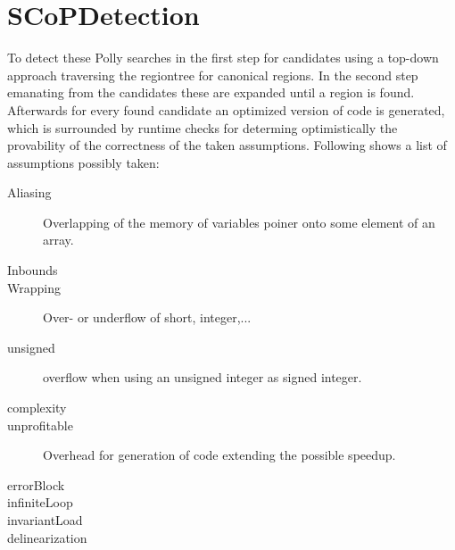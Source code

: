 \section{SCoPDetection}
To detect these \scops Polly searches in the first step for candidates using a top-down approach traversing the regiontree for canonical regions.
In the second step emanating from the candidates these are expanded until a  region is found.
Afterwards  for every found candidate an optimized version of code is generated, which is surrounded by runtime checks for determing optimistically the provability of the correctness of the taken assumptions.
Following shows a list of assumptions possibly taken:
\begin{description}
    \item[Aliasing] Overlapping of the memory of variables \eg poiner onto some element of an array.
    \item[Inbounds] 
    \item[Wrapping] Over- or underflow of short, integer,...
    \item[unsigned] \Eg overflow when using an unsigned integer as signed integer.
    \item[complexity] 
    \item[unprofitable] Overhead for generation of code extending the possible speedup.
    \item[errorBlock]
    \item[infiniteLoop]
    \item[invariantLoad]
    \item[delinearization]
\end{description}

